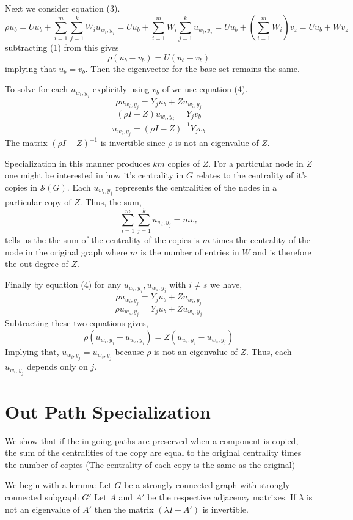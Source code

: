 \documentclass{paper}
\begin{document}
Next we consider equation (3).
\[
\rho u_b 
= Uu_b +\sum_{i=1}^{m}\sum_{j=1}^{k}W_iu_{w_i,y_j}
= Uu_b +\sum_{i=1}^{m}W_i\sum_{j=1}^{k}u_{w_i,y_j}
= Uu_b +(\sum_{i=1}^{m}W_i)v_z
= Uu_b + Wv_z
\]
subtracting (1) from this gives
\[
\rho (u_b-v_b) = U(u_b-v_b)
\]
implying that $u_b = v_b$. Then the eigenvector for the base set remains the same.

To solve for each $u_{w_i,y_j}$ explicitly using $v_b$ of  we use equation (4).
\[
\rho u_{w_i,y_j} = Y_ju_b +Zu_{w_i,y_j}
\]
\[
(\rho I - Z)u_{w_i,y_j} = Y_jv_b 
\]
\[
u_{w_i,y_j} =(\rho I - Z)^{-1} Y_jv_b 
\]
The matrix $(\rho I - Z)^{-1}$ is invertible since $\rho$ is not an eigenvalue of $Z$.

Specialization in this manner produces $km$ copies of $Z$. For a particular node in $Z$ one might be interested in how it's centrality in $G$ relates to the centrality of it's copies in $\mathcal{S}(G)$. Each $u_{w_i,y_j}$ represents the centralities of the nodes in a particular copy of $Z$. Thus, the sum, 
\[
\sum_{i=1}^{m}\sum_{j=1}^{k}u_{w_i,y_j} = mv_z
\]
tells us the the sum of the centrality of the copies is $m$ times the centrality of the node in the original graph where $m$ is the number of entries in $W$ and is therefore  the out degree of $Z$.

Finally by equation (4) for any $u_{w_i,y_j}, u_{w_s,y_j}$ with $i \neq s$ we have,
\[
\rho u_{w_i,y_j} = Y_ju_b +Zu_{w_i,y_j}
\]
\[
\rho u_{w_s,y_j} = Y_ju_b +Zu_{w_s,y_j}
\]
Subtracting these two equations gives,
\[
\rho (u_{w_i,y_j} - u_{w_s,y_j}) = Z(u_{w_i,y_j}-u_{w_s,y_j})
\]
Implying that,
$u_{w_i,y_j} = u_{w_s,y_j}$
because $\rho$ is not an eigenvalue of $Z$. Thus, each $u_{w_i,y_j}$ depends only on $j$.

\newpage

\section*{Out Path Specialization}

We show that if the in going paths are preserved when a component is copied, the sum of the centralities of the copy are equal to the original centrality times the number of copies (The centrality of each copy is the same as the original)

\vspace{.5cm}

We begin with a lemma:
Let $G$ be a strongly connected graph with strongly connected subgraph $G'$  Let $A$ and $A'$ be the respective adjacency matrixes. If $\lambda$ is not an eigenvalue of $A'$ then the matrix $(\lambda I - A')$ is invertible.
\end{document}
